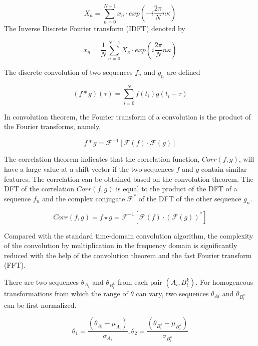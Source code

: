 \documentclass[letterpaper, 10 pt, conference]{ieeeconf}  %
\begin{document}
\begin{equation}\label{equ21}
    X_{\kappa} = \sum_{n=0}^{N-1}x_{n}\cdot exp(-i\frac{2\pi}{N}n\kappa)
\end{equation}
The Inverse Discrete Fourier transform (IDFT) denoted by

\begin{equation}\label{equ22}
    x_{n} = \frac{1}{N}\sum_{n=0}^{N-1}X_{\kappa}\cdot exp(i\frac{2\pi}{N}n\kappa)
\end{equation}

The discrete convolution of two sequences $f_{n}$ and $g_{n}$  are defined

\begin{equation}\label{equ23}
    (f \ast g)(\tau)=\sum_{i=0}^{N}f(t_{i})g(t_{i}-\tau)
\end{equation}

In convolution theorem, the Fourier transform of a convolution is the product of the Fourier transforms, namely,

\begin{equation}\label{equ24}
    f \ast g = \mathcal{F}^{-1} [\mathcal{F}(f) \cdot \mathcal{F}(g)]
\end{equation}

The correlation theorem indicates that the correlation function, $Corr(f,g)$, will have a large value at a shift vector if the two sequences $f$ and $g$ contain similar features. The correlation can be obtained based on the convolution theorem. The DFT of the correlation $Corr(f,g)$ is equal to the product of the DFT of a sequence $f_{n}$ and the complex conjugate $\mathcal{F}^{*}$ of the DFT of the other sequence $g_n$.

\begin{equation}\label{equ25}
    Corr(f,g)=f \star g = \mathcal{F}^{-1}[\mathcal{F}(f) \cdot (\mathcal{F}(g))^{*}]
\end{equation}

Compared with the standard time-domain convolution algorithm, the complexity of the convolution by multiplication in the frequency domain is significantly reduced with the help of the convolution theorem and the fast Fourier transform (FFT).

There are two sequences $\theta_{A_{i}}$ and $\theta_{B_{i}^{k}}$ from each pair $(A_{i},B_{i}^{k})$. For homogeneous transformations from which the range of $\theta$ can vary, two sequences $\theta_{Ai}$ and $\theta_{B_{i}^{k}}$ can be first normalized.

\begin{equation}\label{equ26}
    \theta_{1}=\frac{(\theta_{A_{i}}-\mu_{A_{i}})}{\sigma_{A_{i}}}, \theta_{2}=\frac{(\theta_{B_{i}^{k}}-\mu_{B_{i}^{k}})}{\sigma_{B_{i}^{k}}}
\end{equation}
\end{document}
